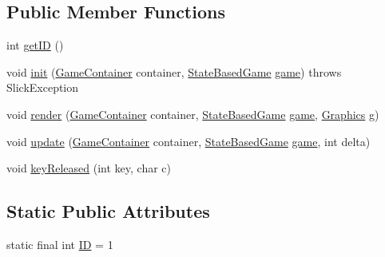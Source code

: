 \subsection*{Public Member Functions}
\begin{DoxyCompactItemize}
\item 
int \mbox{\hyperlink{classorg_1_1newdawn_1_1slick_1_1tests_1_1states_1_1_test_state1_a441e5a49fc651b943a076d76dafa360c}{get\+ID}} ()
\item 
void \mbox{\hyperlink{classorg_1_1newdawn_1_1slick_1_1tests_1_1states_1_1_test_state1_aac578ad98e5a4631d030cb36d8d421de}{init}} (\mbox{\hyperlink{classorg_1_1newdawn_1_1slick_1_1_game_container}{Game\+Container}} container, \mbox{\hyperlink{classorg_1_1newdawn_1_1slick_1_1state_1_1_state_based_game}{State\+Based\+Game}} \mbox{\hyperlink{classorg_1_1newdawn_1_1slick_1_1tests_1_1states_1_1_test_state1_a57818ecf2b21da6af28aed24c4412fb1}{game}})  throws Slick\+Exception 
\item 
void \mbox{\hyperlink{classorg_1_1newdawn_1_1slick_1_1tests_1_1states_1_1_test_state1_a5fbc3543f628bd8f38e9bcd38c019a79}{render}} (\mbox{\hyperlink{classorg_1_1newdawn_1_1slick_1_1_game_container}{Game\+Container}} container, \mbox{\hyperlink{classorg_1_1newdawn_1_1slick_1_1state_1_1_state_based_game}{State\+Based\+Game}} \mbox{\hyperlink{classorg_1_1newdawn_1_1slick_1_1tests_1_1states_1_1_test_state1_a57818ecf2b21da6af28aed24c4412fb1}{game}}, \mbox{\hyperlink{classorg_1_1newdawn_1_1slick_1_1_graphics}{Graphics}} g)
\item 
void \mbox{\hyperlink{classorg_1_1newdawn_1_1slick_1_1tests_1_1states_1_1_test_state1_af8ac211813005d2976684963c46986f8}{update}} (\mbox{\hyperlink{classorg_1_1newdawn_1_1slick_1_1_game_container}{Game\+Container}} container, \mbox{\hyperlink{classorg_1_1newdawn_1_1slick_1_1state_1_1_state_based_game}{State\+Based\+Game}} \mbox{\hyperlink{classorg_1_1newdawn_1_1slick_1_1tests_1_1states_1_1_test_state1_a57818ecf2b21da6af28aed24c4412fb1}{game}}, int delta)
\item 
void \mbox{\hyperlink{classorg_1_1newdawn_1_1slick_1_1tests_1_1states_1_1_test_state1_a0f5e681a7994271ed6db7114015207a7}{key\+Released}} (int key, char c)
\end{DoxyCompactItemize}
\subsection*{Static Public Attributes}
\begin{DoxyCompactItemize}
\item 
static final int \mbox{\hyperlink{classorg_1_1newdawn_1_1slick_1_1tests_1_1states_1_1_test_state1_aa33950fef3d2a1cef2d14a7475796e97}{ID}} = 1
\end{DoxyCompactItemize}
